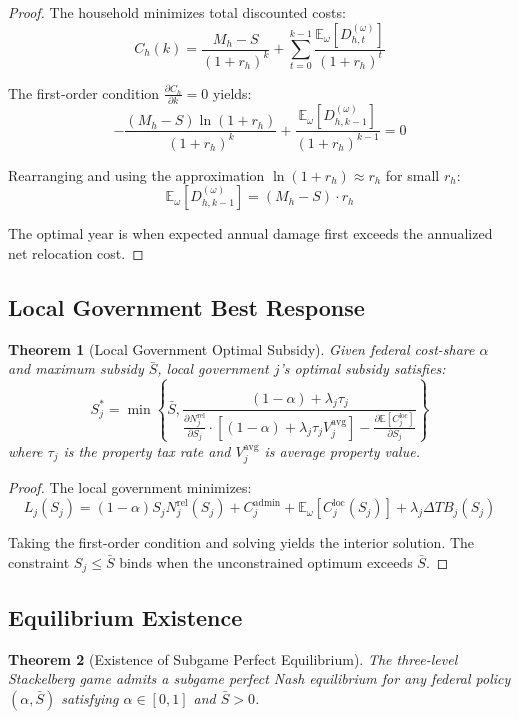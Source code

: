 \documentclass[11pt,letterpaper]{article}
\newtheorem{theorem}{Theorem}
\theoremstyle{definition}
\newcommand{\E}{\mathbb{E}}
\begin{document}
\begin{proof}
The household minimizes total discounted costs:
\[
C_h(k) = \frac{M_h - S}{(1+r_h)^k} + \sum_{t=0}^{k-1} \frac{\E_\omega[D_{h,t}^{(\omega)}]}{(1+r_h)^t}
\]

The first-order condition $\frac{\partial C_h}{\partial k} = 0$ yields:
\[
-\frac{(M_h - S) \ln(1+r_h)}{(1+r_h)^k} + \frac{\E_\omega[D_{h,k-1}^{(\omega)}]}{(1+r_h)^{k-1}} = 0
\]

Rearranging and using the approximation $\ln(1+r_h) \approx r_h$ for small $r_h$:
\[
\E_\omega[D_{h,k-1}^{(\omega)}] = (M_h - S) \cdot r_h
\]

The optimal year is when expected annual damage first exceeds the annualized net relocation cost.
\end{proof}

\subsection{Local Government Best Response}

\begin{theorem}[Local Government Optimal Subsidy]
Given federal cost-share $\alpha$ and maximum subsidy $\bar{S}$, local government $j$'s optimal subsidy satisfies:
\begin{equation}
S_j^* = \min\left\{\bar{S}, \frac{(1-\alpha) + \lambda_j \tau_j}{\frac{\partial N_j^{\text{rel}}}{\partial S_j} \cdot \left[(1-\alpha) + \lambda_j \tau_j V_j^{\text{avg}}\right] - \frac{\partial \E[C_j^{\text{loc}}]}{\partial S_j}}\right\}
\end{equation}
where $\tau_j$ is the property tax rate and $V_j^{\text{avg}}$ is average property value.
\end{theorem}

\begin{proof}
The local government minimizes:
\[
L_j(S_j) = (1-\alpha) S_j N_j^{\text{rel}}(S_j) + C_j^{\text{admin}} + \E_\omega[C_j^{\text{loc}}(S_j)] + \lambda_j \Delta TB_j(S_j)
\]

Taking the first-order condition and solving yields the interior solution. The constraint $S_j \leq \bar{S}$ binds when the unconstrained optimum exceeds $\bar{S}$.
\end{proof}

\subsection{Equilibrium Existence}

\begin{theorem}[Existence of Subgame Perfect Equilibrium]
The three-level Stackelberg game admits a subgame perfect Nash equilibrium for any federal policy $(\alpha, \bar{S})$ satisfying $\alpha \in [0,1]$ and $\bar{S} > 0$.
\end{theorem}
\end{document}
